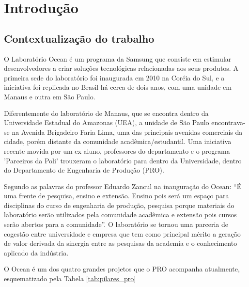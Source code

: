 \chapter[Introdução]{Introdução}
\label{chap:introducao}
\section{Contextualização do trabalho}
\label{cha:contexto}

O Laboratório Ocean é um programa da Samsung que consiste em estimular desenvolvedores a criar soluções tecnológicas relacionadas aos seus produtos. A primeira sede do laboratório foi inaugurada em 2010 na Coréia do Sul, e a iniciativa foi replicada no Brasil há cerca de dois anos, com uma unidade em Manaus e outra em São Paulo.

Diferentemente do laboratório de Manaus, que se encontra dentro da Universidade Estadual do Amazonas (UEA), a unidade de São Paulo encontrava-se na Avenida Brigadeiro Faria Lima, uma das principais avenidas comerciais da cidade, porém distante da comunidade acadêmica/estudantil. Uma iniciativa recente movida por um ex-aluno, professores do departamento e o programa 'Parceiros da Poli' trouxeram o laboratório para dentro da Universidade, dentro do Departamento de Engenharia de Produção (PRO).

Segundo as palavras do professor Eduardo Zancul na inauguração do Ocean: “É uma frente de pesquisa, ensino e extensão. Ensino pois será um espaço para disciplinas do curso de engenharia de produção, pesquisa porque materiais do laboratório serão utilizados pela comunidade acadêmica e extensão pois cursos serão abertos para a comunidade”. O laboratório se tornou uma parceria de cogestão entre universidade e empresa que tem como principal mérito a geração de valor derivada da sinergia entre as pesquisas da academia e o conhecimento aplicado da indústria. 

O Ocean é um dos quatro grandes projetos que o PRO acompanha atualmente, esquematizado pela Tabela \ref{tab:pilares_pro}

